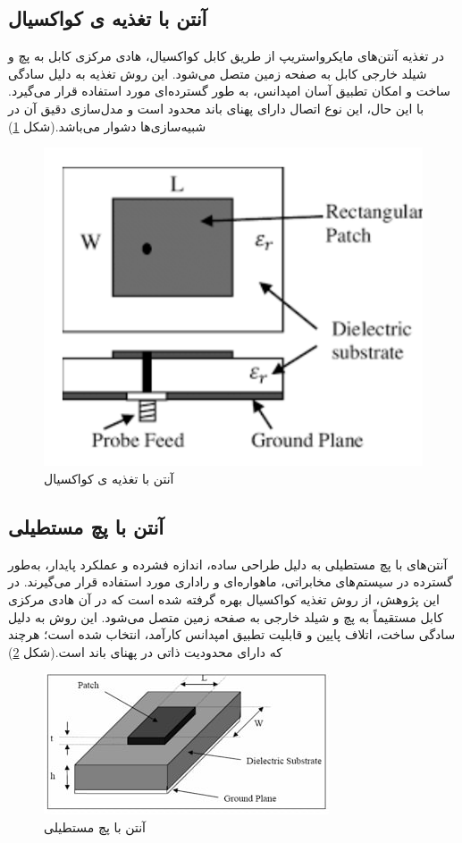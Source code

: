 \subsection{آنتن با تغذیه ی کواکسیال}
در تغذیه آنتن‌های مایکرواستریپ از طریق کابل کواکسیال، هادی مرکزی کابل به پچ و شیلد خارجی کابل به صفحه زمین متصل می‌شود. این روش تغذیه به دلیل سادگی ساخت و امکان تطبیق آسان امپدانس، به طور گسترده‌ای مورد استفاده قرار می‌گیرد. با این حال، این نوع اتصال دارای پهنای باند محدود است و مدل‌سازی دقیق آن در شبیه‌سازی‌ها دشوار می‌باشد.(شکل
\ref{fig6})
\begin{figure}
	\centering
	\includegraphics[scale=0.3]{Images/fig6.png}
	\caption{آنتن با تغذیه ی کواکسیال}
	\label{fig6}
\end{figure}


\subsection{آنتن با پچ مستطیلی}
آنتن‌های با پچ مستطیلی به دلیل طراحی ساده، اندازه فشرده و عملکرد پایدار، به‌طور گسترده در سیستم‌های مخابراتی، ماهواره‌ای و راداری مورد استفاده قرار می‌گیرند. در این پژوهش، از روش تغذیه کواکسیال بهره گرفته شده است که در آن هادی مرکزی کابل مستقیماً به پچ و شیلد خارجی به صفحه زمین متصل می‌شود. این روش به دلیل سادگی ساخت، اتلاف پایین و قابلیت تطبیق امپدانس کارآمد، انتخاب شده است؛ هرچند که دارای محدودیت ذاتی در پهنای باند است.(شکل 
\ref{fig7})
\begin{figure}
	\centering
	\includegraphics[scale=0.9]{Images/fig7.jpg}
	\caption{آنتن با پچ مستطیلی}
	\label{fig7}
\end{figure}


